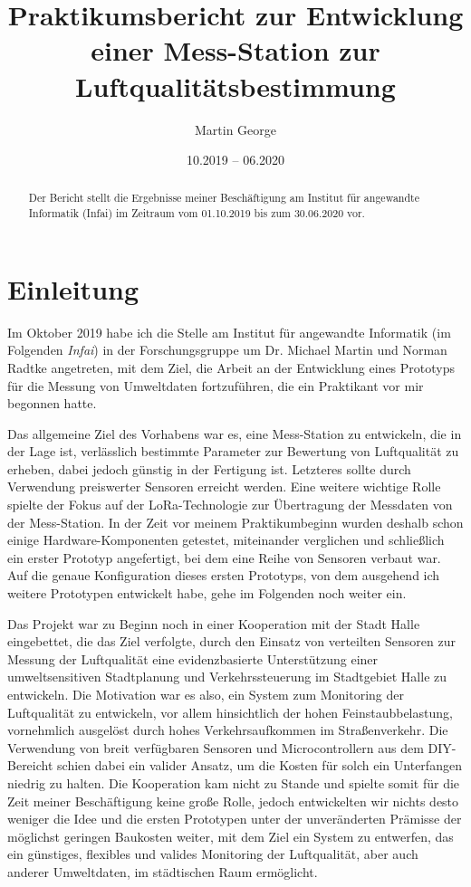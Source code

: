 \documentclass[a4paper,11pt]{article}
\title{Praktikumsbericht zur Entwicklung\\ einer Mess-Station zur
  Luftqualitätsbestimmung}
\author{Martin George}
\date{10.2019 -- 06.2020}
\begin{document}
\maketitle
\begin{abstract}
  Der Bericht stellt die Ergebnisse meiner Beschäftigung am Institut für
  angewandte Informatik (Infai) im Zeitraum vom 01.10.2019 bis zum 30.06.2020
  vor.
\end{abstract}
\tableofcontents
\newpage

\section{Einleitung}
Im Oktober 2019 habe ich die Stelle am Institut für angewandte Informatik (im
Folgenden \textit{Infai}) in der Forschungsgruppe um Dr. Michael Martin und
Norman Radtke angetreten, mit dem Ziel, die Arbeit an der Entwicklung eines
Prototyps für die Messung von Umweltdaten fortzuführen, die ein Praktikant vor
mir begonnen hatte.

Das allgemeine Ziel des Vorhabens war es, eine Mess-Station zu entwickeln, die
in der Lage ist, verlässlich bestimmte Parameter zur Bewertung von
Luftqualität zu erheben, dabei jedoch günstig in der Fertigung ist. Letzteres
sollte durch Verwendung preiswerter Sensoren erreicht werden. Eine weitere
wichtige Rolle spielte der Fokus auf der LoRa-Technologie zur Übertragung der
Messdaten von der Mess-Station. In der Zeit vor meinem Praktikumbeginn wurden
deshalb schon einige Hardware-Komponenten getestet, miteinander verglichen und
schließlich ein erster Prototyp angefertigt, bei dem eine Reihe von Sensoren
verbaut war. Auf die genaue Konfiguration dieses ersten Prototyps, von dem
ausgehend ich weitere Prototypen entwickelt habe, gehe im Folgenden noch
weiter ein.

Das Projekt war zu Beginn noch in einer Kooperation mit der Stadt Halle
eingebettet, die das Ziel verfolgte, durch den Einsatz von verteilten Sensoren
zur Messung der Luftqualität eine evidenzbasierte Unterstützung einer
umweltsensitiven Stadtplanung und Verkehrssteuerung im Stadtgebiet Halle zu
entwickeln. Die Motivation war es also, ein System zum Monitoring der
Luftqualität zu entwickeln, vor allem hinsichtlich der hohen
Feinstaubbelastung, vornehmlich ausgelöst durch hohes Verkehrsaufkommen im
Straßenverkehr. Die Verwendung von breit verfügbaren Sensoren und
Microcontrollern aus dem DIY-Bereicht schien dabei ein valider Ansatz, um die
Kosten für solch ein Unterfangen niedrig zu halten. Die Kooperation kam nicht
zu Stande und spielte somit für die Zeit meiner Beschäftigung keine große
Rolle, jedoch entwickelten wir nichts desto weniger die Idee und die ersten
Prototypen unter der unveränderten Prämisse der möglichst geringen Baukosten
weiter, mit dem Ziel ein System zu entwerfen, das ein günstiges, flexibles und
valides Monitoring der Luftqualität, aber auch anderer Umweltdaten, im
städtischen Raum ermöglicht.
\end{document}
